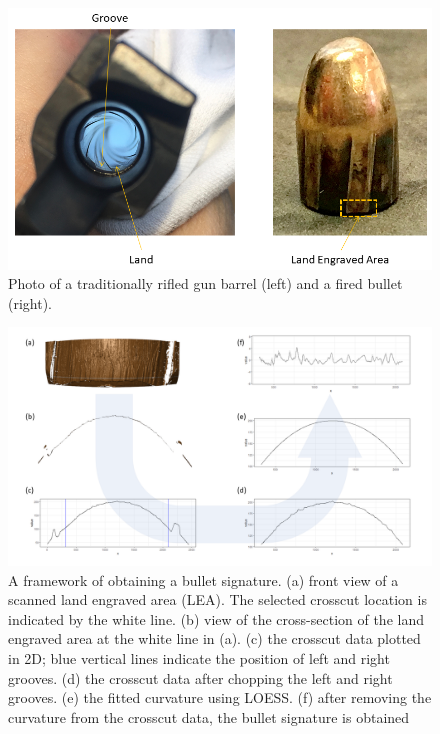 \begin{Schunk}
\begin{figure}

{\centering \includegraphics[width=.8\textwidth]{ju-hofmann_files/figure-latex/barrel_bullet_ps} 

}

\caption[Photo of a traditionally rifled gun barrel (left) and a fired bullet (right)]{Photo of a traditionally rifled gun barrel (left) and a fired bullet (right).}\label{fig:bullet}
\end{figure}
\end{Schunk}

\begin{Schunk}
\begin{figure}

{\centering \includegraphics[width=.9\textwidth]{ju-hofmann_files/figure-latex/figure1_v2} 

}

\caption[A framework of obtaining a bullet signature]{A framework of obtaining a bullet signature. (a) front view of a scanned land engraved area (LEA). The selected crosscut location is indicated by the white line. (b) view of the cross-section of the land engraved area at the white line in (a). (c) the crosscut data plotted in 2D; blue vertical lines indicate the position of left and right grooves. (d) the crosscut data after chopping the left and right grooves. (e) the fitted curvature using LOESS. (f) after removing the curvature from the crosscut data, the bullet signature is obtained}\label{fig:process}
\end{figure}
\end{Schunk}

